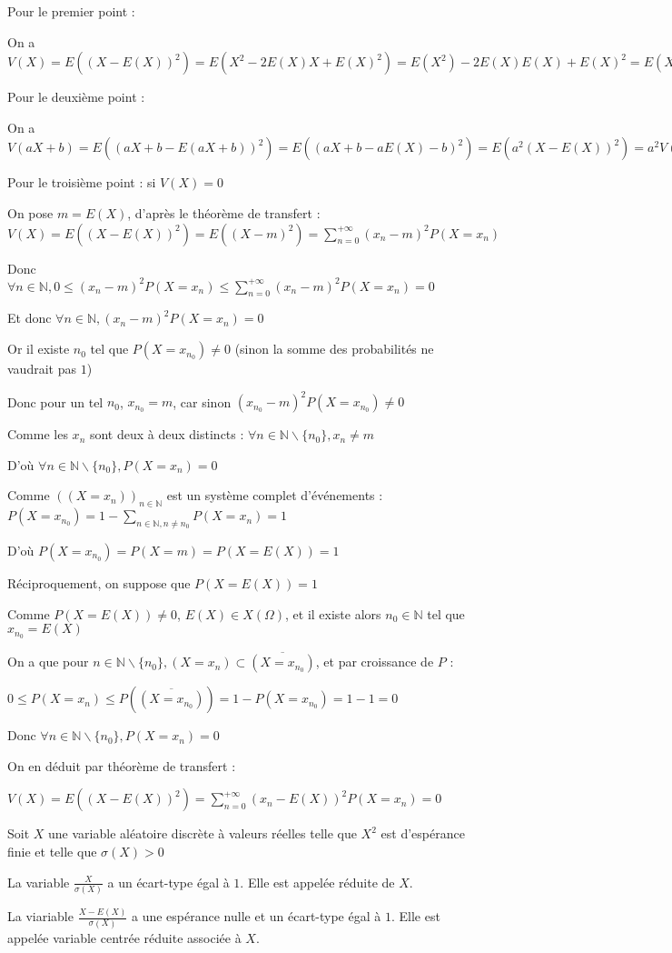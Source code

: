 \documentclass[a4paper,12pt]{book}
\newcommand{\Def}[2]{\begin{tcolorbox}[sharp corners, colback=white,colframe=blue!90!black!75, title=Définition : #1]#2\end{tcolorbox}}
\newcommand{\Pre}[1]{\begin{tcolorbox}[sharp corners, colback=white,colframe=green!60!green!30!black!75, title=Preuve]#1\end{tcolorbox}}
\def\N{\mathbb{N}}
\begin{document}
\Pre{Pour le premier point :
\par On a $V(X)=E((X-E(X))^2)=E(X^2-2E(X)X+E(X)^2)= E(X^2)-2E(X)E(X)+E(X)^2 = E(X^2)-E(X)^2$
\par Pour le deuxième point :
\par On a $V(aX+b) = E((aX+b-E(aX+b))^2)=E((aX+b-aE(X)-b)^2)=E(a^2(X-E(X))^2)=a^2V(X)$}
\Pre{Pour le troisième point : si $V(X)=0$
\par On pose $m=E(X)$, d'après le théorème de transfert : $V(X)=E((X-E(X))^2)=E((X-m)^2)=\sum\limits_{n=0}^{+\infty}(x_n-m)^2P(X=x_n)$
\par Donc $\forall n\in\N, 0\leq (x_n-m)^2P(X=x_n)\leq\sum\limits_{n=0}^{+\infty}(x_n-m)^2P(X=x_n)=0$
\par Et donc $\forall n\in\N, (x_n-m)^2P(X=x_n)=0$
\par Or il existe $n_0$ tel que $P(X=x_{n_0})\neq 0$ (sinon la somme des probabilités ne vaudrait pas $1$)
\par Donc pour un tel $n_0$, $x_{n_0}=m$, car sinon $(x_{n_0}-m)^2P(X=x_{n_0})\neq 0$
\par Comme les $x_n$ sont deux à deux distincts : $\forall n\in\N\backslash\{n_0\}, x_n\neq m$
\par D'où $\forall n\in\N\backslash\{n_0\}, P(X=x_n)=0$
\par Comme $((X=x_n))_{n\in\N}$ est un système complet d'événements : $P(X=x_{n_0})=1-\sum\limits_{n\in\N, n\neq n_0}P(X=x_n)=1$
\par D'où $P(X=x_{n_0})=P(X=m)=P(X=E(X))=1$
\par Réciproquement, on suppose que $P(X=E(X))=1$
\par Comme $P(X=E(X))\neq 0$, $E(X)\in X(\Omega)$, et il existe alors $n_0\in\N$ tel que $x_{n_0}=E(X)$
\par On a que pour $n\in\N\backslash\{n_0\}, (X=x_n)\subset\overline{(X=x_{n_0})}$, et par croissance de $P$ : \par $0\leq P(X=x_n)\leq P(\overline{(X=x_{n_0})})=1-P(X=x_{n_0})=1-1=0$
\par Donc $\forall n\in\N\backslash\{n_0\}, P(X=x_n)=0$
\par On en déduit par théorème de transfert : \par $V(X)=E((X-E(X))^2) = \sum\limits_{n=0}^{+\infty}(x_n-E(X))^2P(X=x_n)=0$}
\Def{}{Soit $X$ une variable aléatoire discrète à valeurs réelles telle que $X^2$ est d'espérance finie et telle que $\sigma(X)>0$
\par La variable $\frac{X}{\sigma(X)}$ a un écart-type égal à $1$. Elle est appelée réduite de $X$.
\par La viariable $\frac{X-E(X)}{\sigma(X)}$ a une espérance nulle et un écart-type égal à $1$. Elle est appelée variable centrée réduite associée à $X$.}
\end{document}
